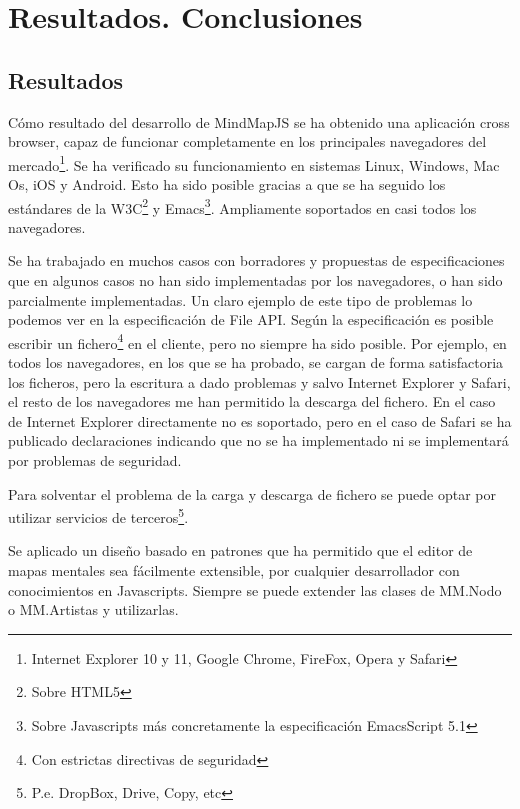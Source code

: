 \newpage\mbox{}\thispagestyle{empty}

\chapter{Resultados. Conclusiones}

\section{Resultados}


Cómo resultado del desarrollo de MindMapJS se ha obtenido una aplicación cross browser, capaz de funcionar completamente en los principales navegadores del mercado\footnote{Internet Explorer 10 y 11, Google Chrome, FireFox, Opera y Safari}. Se ha verificado su funcionamiento en sistemas Linux, Windows, Mac Os, iOS y Android. Esto ha sido posible gracias a que se ha seguido los estándares de la W3C\footnote{Sobre HTML5} y Emacs\footnote{Sobre Javascripts más concretamente la especificación EmacsScript 5.1}. Ampliamente soportados en casi todos los navegadores. 

Se ha trabajado en muchos casos con borradores y propuestas de especificaciones que en algunos casos no han sido implementadas por los navegadores, o han sido parcialmente implementadas. Un claro ejemplo de este tipo de problemas lo podemos ver en la especificación de File API. Según la especificación es posible escribir un fichero\footnote{Con estrictas directivas de seguridad} en el cliente, pero no siempre ha sido posible. Por ejemplo, en todos los navegadores, en los que se ha probado, se cargan de forma satisfactoria los ficheros, pero la escritura a dado problemas y salvo Internet Explorer y Safari, el resto de los navegadores me han permitido la descarga del fichero. En el caso de Internet Explorer directamente no es soportado, pero en el caso de Safari se ha publicado declaraciones indicando que no se ha implementado ni se implementará por problemas de seguridad. 

Para solventar el problema de la carga y descarga de fichero se puede optar por utilizar servicios de terceros\footnote{P.e. DropBox, Drive, Copy, etc}. 

Se aplicado un diseño basado en patrones que ha permitido que el editor de mapas mentales sea fácilmente extensible, por cualquier desarrollador con conocimientos en Javascripts. Siempre se puede extender las clases de MM.Nodo o MM.Artistas y utilizarlas. 

